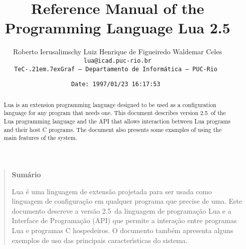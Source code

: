 

\newcommand{\rw}[1]{{\bf #1}}
\newcommand{\see}[1]{(see Section~\ref{#1})}
\newcommand{\nil}{{\bf nil}}
\newcommand{\Line}{\rule{\linewidth}{.5mm}}
\def\tecgraf{{\sf TeC\kern-.21em\lower.7ex\hbox{Graf}}}

\newcommand{\Index}[1]{#1\index{#1}}
\newcommand{\IndexVerb}[1]{{\tt #1}\index{#1}}
\newcommand{\Def}[1]{{\em #1}\index{#1}}
\newcommand{\Deffunc}[1]{\index{#1}}

\newcommand{\ff}{$\bullet$\ }

\newcommand{\Version}{2.5}

\makeindex



\title{Reference Manual of the Programming Language Lua \Version}

\author{%
Roberto Ierusalimschy\quad
Luiz Henrique de Figueiredo\quad
Waldemar Celes
\vspace{1.0ex}\\
\smallskip
\small\tt lua@icad.puc-rio.br
\vspace{2.0ex}\\
\tecgraf\ --- Departamento de Inform\'atica --- PUC-Rio
}

\date{\small \verb$Date: 1997/01/23 16:17:53 $}

\maketitle

\thispagestyle{empty}
\pagestyle{empty}

\begin{abstract}
\noindent
Lua is an extension programming language designed to be used
as a configuration language for any program that needs one.
This document describes version \Version\ of the Lua programming language and
the API that allows interaction between Lua programs and their host C programs.
The document also presents some examples of using the main
features of the system.
\end{abstract}

\vspace{4ex}
\begin{quotation}
\small
\begin{center}{\bf Sum\'ario}\end{center}
\vspace{1ex}
\noindent
Lua \'e uma linguagem de extens\~ao projetada para ser usada como
linguagem de configura\c{c}\~ao em qualquer programa que precise de
uma.
Este documento descreve a vers\~ao \Version\ da linguagem de
programa\c{c}\~ao Lua e a Interface de Programa\c{c}\~ao (API) que permite
a intera\c{c}\~ao entre programas Lua e programas C hospedeiros.
O documento tamb\'em apresenta alguns exemplos de uso das principais
ca\-racte\-r\'{\i}sticas do sistema.
\end{quotation}


